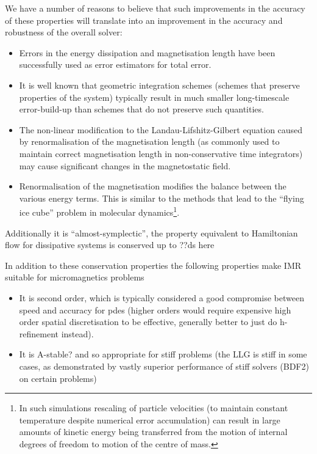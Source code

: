 We have a number of reasons to believe that such improvements in the accuracy of these properties will translate into an improvement in the accuracy and robustness of the overall solver:
\begin{itemize}
\item Errors in the energy dissipation\cite{Albuquerque2001} and magnetisation length\cite{Chantrell2001} have been successfully used as error estimators for total error.

\item It is well known that geometric integration schemes (\ie schemes that preserve properties of the system) typically result in much smaller long-timescale error-build-up than schemes that do not preserve such quantities.\cite[pg. 77]{Iserles2009}

\item The non-linear modification to the Landau-Lifshitz-Gilbert equation caused by renormalisation of the magnetisation length (as commonly used to maintain correct magnetisation length in non-conservative time integrators) may cause significant changes in the magnetostatic field.\cite{Lewis2003}

\item Renormalisation of the magnetisation modifies the balance between the various energy terms.
  This is similar to the methods that lead to the ``flying ice cube'' problem in molecular dynamics\footnote{In such simulations rescaling of particle velocities (to maintain constant temperature despite numerical error accumulation) can result in large amounts of kinetic energy being transferred from the motion of internal degrees of freedom to motion of the centre of mass.}.\cite{Harvey1998}
\end{itemize}

Additionally it is ``almost-symplectic'', \ie the property equivalent to Hamiltonian flow for  dissipative systems is conserved up to \cite{daquino2005}\cite{??ds-older-paper for this?} ??ds here

In addition to these conservation properties the following properties make IMR suitable for micromagnetics problems
\begin{itemize}
\item It is second order, which is typically considered a good compromise between speed and accuracy for pdes (higher orders would require expensive high order spatial discretisation to be effective, generally better to just do h-refinement instead).\cite{Matthias}
\item It is A-stable? \cite{??ds} and so appropriate for stiff problems (the LLG is stiff in some cases, as demonstrated by vastly superior performance of stiff solvers (\eg BDF2) on certain problems\cite{Tsiantos2001})
\end{itemize}

